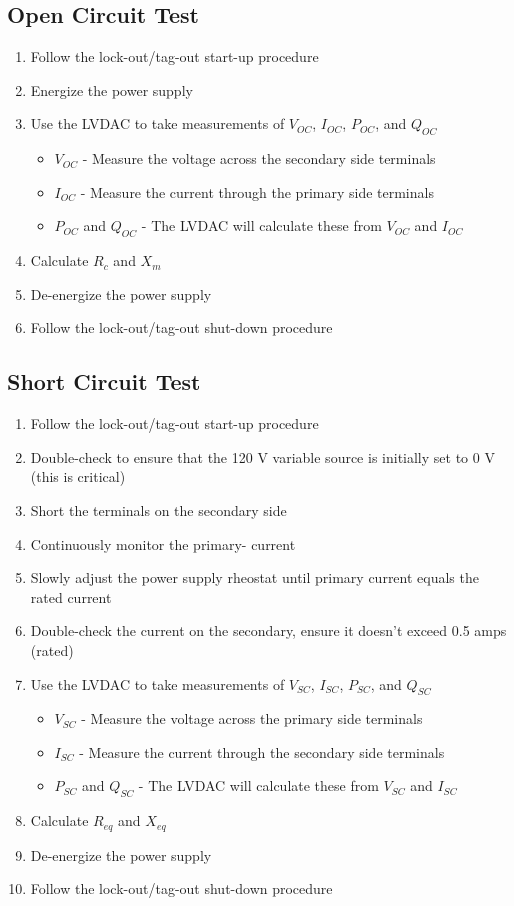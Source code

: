 \subsection{Open Circuit Test}
\begin{enumerate}
	\item Follow the lock-out/tag-out start-up procedure
	\item Energize the power supply
	\item Use the LVDAC to take measurements of $V_{OC}$, $I_{OC}$, $P_{OC}$, and $Q_{OC}$
	      \begin{itemize}
		      \item $V_{OC}$ - Measure the voltage across the secondary side terminals
		      \item $I_{OC}$ - Measure the current through the primary side terminals
		      \item $P_{OC}$ and $Q_{OC}$ - The LVDAC will calculate these from $V_{OC}$ and $I_{OC}$
	      \end{itemize}
	\item Calculate $R_{c}$ and $X_{m}$
	\item De-energize the power supply
	\item Follow the lock-out/tag-out shut-down procedure
\end{enumerate}
\subsection{Short Circuit Test}
\begin{enumerate}
	\item Follow the lock-out/tag-out start-up procedure
	\item Double-check to ensure that the 120 V variable source is initially set to 0 V (this is critical)
	\item Short the terminals on the secondary side
	\item Continuously monitor the primary- current
	\item Slowly adjust the power supply rheostat until primary current equals the rated current
	\item Double-check the current on the secondary, ensure it doesn't exceed 0.5 amps (rated)
	\item Use the LVDAC to take measurements of $V_{SC}$, $I_{SC}$, $P_{SC}$, and $Q_{SC}$
	      \begin{itemize}
		      \item $V_{SC}$ - Measure the voltage across the primary side terminals
		      \item $I_{SC}$ - Measure the current through the secondary side terminals
		      \item $P_{SC}$ and $Q_{SC}$ - The LVDAC will calculate these from $V_{SC}$ and $I_{SC}$
	      \end{itemize}
	\item Calculate $R_{eq}$ and $X_{eq}$
	\item De-energize the power supply
	\item Follow the lock-out/tag-out shut-down procedure
\end{enumerate}

